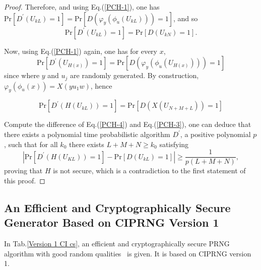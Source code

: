 \begin{proof}
Therefore, and using Eq.(\ref{PCH-1}),
one has
$\mathrm{Pr}[D^\prime(U_{kL})=1]=\mathrm{Pr}[D(\varphi_y(\phi_u(U_{kL})))=1]$, and so
\begin{equation}\label{PCH-2}
\mathrm{Pr}[D^\prime(U_{kL})=1]=\mathrm{Pr}[D(U_{kN})=1].
\end{equation}

Now, using Eq.(\ref{PCH-1}) again, one has  for every $x$,
\begin{equation}\label{PCH-3}
\mathrm{Pr}[D^\prime(U_{H(x)})=1]=\mathrm{Pr}[D(\varphi_y(\phi_u(U_{H(x)})))=1] 
\end{equation}
since where $y$ and $u_j$ are randomly generated. By construction, $\varphi_y(\phi_u(x))=X(yu_1w)$, hence 

\begin{equation}\label{PCH-4}
\mathrm{Pr}[D^\prime(H(U_{kL}))=1]=\mathrm{Pr}[D(X(U_{N+M+L}))=1]
\end{equation}

Compute the difference of Eq.(\ref{PCH-4}) and Eq.(\ref{PCH-3}), one can deduce that there exists a polynomial time probabilistic algorithm $D^\prime$, a positive polynomial $p$, such that for all $k_0$ there exists $L+M+N\geq {k_0}$ satisfying $$| \mathrm{Pr}[D^\prime(H(U_{KL}))=1]-\mathrm{Pr}[D(U_{kL})=1]|\geq \frac{1}{p(L+M+N)},$$ proving that $H$ is not secure, which is a contradiction to the first statement of this proof. 
\end{proof}

\subsection{An Efficient and Cryptographically Secure Generator Based on CIPRNG Version 1}
In Tab.\ref{Version 1 CI cs}, an efficient and cryptographically secure 
PRNG algorithm with good random qualities~\cite{bibtexwangqianxue} is given. It is based on CIPRNG version 1.

